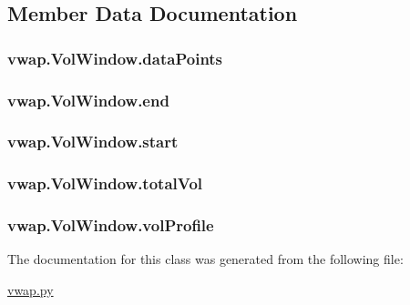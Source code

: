 \subsection{Member Data Documentation}
\hypertarget{classvwap_1_1_vol_window_a6cab681b9d345ee2aeea8b96fb567cd4}{
\subsubsection[{data\-Points}]{\setlength{\rightskip}{0pt plus 5cm}vwap.\-Vol\-Window.\-data\-Points}}\label{classvwap_1_1_vol_window_a6cab681b9d345ee2aeea8b96fb567cd4}
\hypertarget{classvwap_1_1_vol_window_af5b1f122cb50eddb5b1326184b8e7bbf}{
\subsubsection[{end}]{\setlength{\rightskip}{0pt plus 5cm}vwap.\-Vol\-Window.\-end}}\label{classvwap_1_1_vol_window_af5b1f122cb50eddb5b1326184b8e7bbf}
\hypertarget{classvwap_1_1_vol_window_af63dc745bd026d49ab883a10d03217df}{
\subsubsection[{start}]{\setlength{\rightskip}{0pt plus 5cm}vwap.\-Vol\-Window.\-start}}\label{classvwap_1_1_vol_window_af63dc745bd026d49ab883a10d03217df}
\hypertarget{classvwap_1_1_vol_window_a3d92ce21ab2a267623ebb178363c8b3d}{
\subsubsection[{total\-Vol}]{\setlength{\rightskip}{0pt plus 5cm}vwap.\-Vol\-Window.\-total\-Vol}}\label{classvwap_1_1_vol_window_a3d92ce21ab2a267623ebb178363c8b3d}
\hypertarget{classvwap_1_1_vol_window_aedf3b292d8ee0df50e48e9bda5cb5c34}{
\subsubsection[{vol\-Profile}]{\setlength{\rightskip}{0pt plus 5cm}vwap.\-Vol\-Window.\-vol\-Profile}}\label{classvwap_1_1_vol_window_aedf3b292d8ee0df50e48e9bda5cb5c34}


The documentation for this class was generated from the following file\-:\begin{DoxyCompactItemize}
\item 
\hyperlink{vwap_8py}{vwap.\-py}\end{DoxyCompactItemize}
